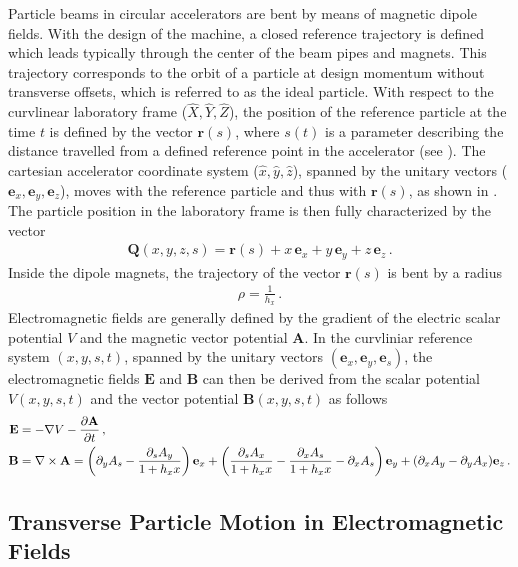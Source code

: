 Particle beams in circular accelerators are bent by means of magnetic dipole fields. With the design of the machine, a closed reference trajectory is defined which leads typically through the center of the beam pipes and magnets. This trajectory corresponds to the orbit of a particle at design momentum without transverse offsets, which is referred to as the ideal particle. With respect to the curvlinear laboratory frame ($\hat X, \hat Y, \hat Z$), the position of the reference particle at the time $t$ is defined by the vector $\textbf{r}(s)$, where $s(t)$ is a parameter describing the distance travelled from a defined reference point in the accelerator (see ). The cartesian accelerator coordinate system ($\hat x, \hat y, \hat z$), spanned by the unitary vectors ($\textbf{e}_x, \textbf{e}_y, \textbf{e}_z$), moves with the reference particle and thus with $\textbf{r}(s)$, as shown in . The particle position in the laboratory frame is then fully characterized by the vector
%
\begin{align}
\textbf{Q}(x,y,z,s) = \textbf{r} (s) + x  \, \textbf{e}_x + y \,  \textbf{e}_y + z \, \textbf{e}_z \, . \label{eq:refframe}
\end{align}
%
Inside the dipole magnets, the trajectory of the vector $\textbf{r}(s)$ is bent by a radius 
\begin{align}
\rho = \frac{1}{h_x} \, .
\end{align}
%
%
Electromagnetic fields are generally defined by the gradient of the electric scalar potential $V$ and the magnetic vector potential $\textbf{A}$. In the curvliniar reference system $(x,y,s,t)$, spanned by the unitary vectors $(\textbf{e}_x,\textbf{e}_y,\textbf{e}_s)$, the electromagnetic fields $\textbf{E}$ and $\textbf{B}$ can then be derived from the scalar potential $V(x,y,s,t)$ and the vector potential $\textbf{B}(x,y,s,t)$ as follows~\cite{wolski2014beam}
\begin{align}
\textbf{E} &= -\nabla V - \frac{\partial \textbf{A}}{\partial t}  \, , \\
\textbf{B} &= \nabla \times \textbf{A} = \left( \partial_y A_s - \frac{\partial_s A_y}{1+h_x x } \right) \textbf{e}_x + \left( \frac{\partial_s A_x}{1+h_x x} - \frac{\partial_x A_s}{1+h_x x}  - \partial_x A_s \right) \textbf{e}_y + (\partial_x A_y - \partial_y A_x) \textbf{e}_z \, .
\end{align}




\subsection{Transverse Particle Motion in Electromagnetic Fields}\label{transverse:ions}
